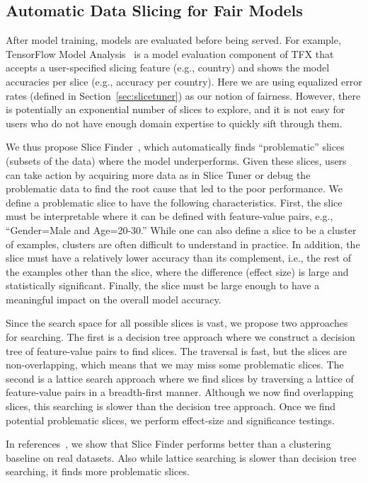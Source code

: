 \documentclass[11pt]{article}
\newcommand{\slicetuner}{Slice Tuner}
\newcommand{\slicefinder}{Slice Finder}
\begin{document}
\subsection{Automatic Data Slicing for Fair Models}

After model training, models are evaluated before being served. For example, TensorFlow Model Analysis~\cite{tfma} is a model evaluation component of TFX that accepts a user-specified slicing feature (e.g., country) and shows the model accuracies per slice (e.g., accuracy per country). Here we are using equalized error rates (defined in Section~\ref{sec:slicetuner}) as our notion of fairness.
However, there is potentially an exponential number of slices to explore, and it is not easy for users who do not have enough domain expertise to quickly sift through them. 

We thus propose \slicefinder{}~\cite{DBLP:conf/icde/ChungKPTW19,DBLP:journals/tkde/ChungKPTW20}, which automatically finds ``problematic'' slices (subsets of the data) where the model underperforms. Given these slices, users can take action by acquiring more data as in \slicetuner{} or debug the problematic data to find the root cause that led to the poor performance. We define a problematic slice to have the following characteristics. First, the slice must be interpretable where it can be defined with feature-value pairs, e.g., ``Gender=Male and Age=20-30.'' While one can also define a slice to be a cluster of examples, clusters are often difficult to understand in practice. In addition, the slice must have a relatively lower accuracy than its complement, i.e., the rest of the examples other than the slice, where the difference (effect size) is large and statistically significant. Finally, the slice must be large enough to have a meaningful impact on the overall model accuracy.


Since the search space for all possible slices is vast, we propose two approaches for searching. The first is a decision tree approach where we construct a decision tree of feature-value pairs to find slices. The traversal is fast, but the slices are non-overlapping, which means that we may miss some problematic slices. The second is a lattice search approach where we find slices by traversing a lattice of feature-value pairs in a breadth-first manner. Although we now find overlapping slices, this searching is slower than the decision tree approach. Once we find potential problematic slices, we perform effect-size and significance testings.

In references~\cite{DBLP:conf/icde/ChungKPTW19,DBLP:journals/tkde/ChungKPTW20}, we show that \slicefinder{} performs better than a clustering baseline on real datasets. Also while lattice searching is slower than decision tree searching, it finds more problematic slices. 
\end{document}
